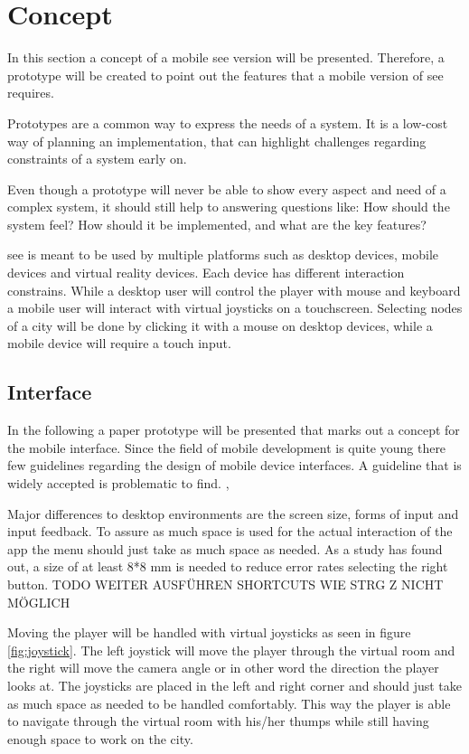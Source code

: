 \section{Concept}
\label{section:concept}
In this section a concept of a mobile \gls{see} version will be presented. 
Therefore, a prototype will be created to point out the features that a mobile version of \gls{see} requires.

Prototypes are a common way to express the needs of a system. 
It is a low-cost way of planning an implementation, that can highlight challenges regarding constraints of a system early on.

Even though a prototype will never be able to show every aspect and need of a complex system, it should still help to answering questions like: 
How should the system feel? How should it be implemented, and what are the key features? \cite{houde1997prototypes} 

\gls{see} is meant to be used by multiple platforms such as desktop devices, mobile devices and virtual reality devices.
Each device has different interaction constrains. 
While a desktop user will control the player with mouse and keyboard a mobile user will interact with virtual joysticks on a touchscreen.
Selecting nodes of a \gls{city} will be done by clicking it with a mouse on desktop devices, while a mobile device will require a touch input.

\subsection{Interface}

In the following a paper prototype will be presented that marks out a concept for the mobile interface.
Since the field of mobile development is quite young there few guidelines regarding the design of mobile device interfaces.
A guideline that is widely accepted is problematic to find. \cite{renaud2017demarcating}, \cite{punchoojit2017usability}

Major differences to desktop environments are the screen size, forms of input and input feedback.
To assure as much space is used for the actual interaction of the app the menu should just take as much space as needed.
As a study has found out, a size of at least 8*8 mm is needed to reduce error rates selecting the right button. \cite{conradi2015optimal} \cite{parhi2006target}
TODO WEITER AUSFÜHREN
SHORTCUTS WIE STRG Z NICHT MÖGLICH
 \cite{adipat2005interface} 

Moving the player will be handled with virtual joysticks as seen in figure \ref{fig:joystick}.
The left joystick will move the player through the virtual room and the right will move the camera angle or in other word the direction the player looks at.
The joysticks are placed in the left and right corner and should just take as much space as needed to be handled comfortably.
This way the player is able to navigate through the virtual room with his/her thumps while still having enough space to work on the \gls{city}.

